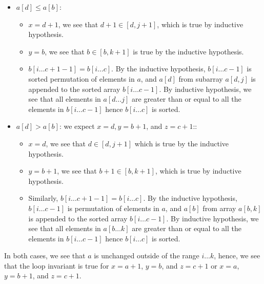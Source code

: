 \begin{parts}
\begin{customsolutionbox}
            \begin{itemize}
                \item \textbf{$a[d] \leq a[b]$}:
                    \begin{itemize}
                        \item $x = d+1$, we see that $d+1 \in [d, j+1]$, which is true by inductive hypothesis.
                        \item $y=b$, we see that $b \in [b, k+1]$ is true by the inductive hypothesis.
                        \item $b[i \ldots c+1-1] = b[i\ldots c]$. By the inductive hypothesis, $b[i \ldots c-1]$ is sorted permutation of elements in $a$, and
                            $a[d]$ from subarray $a[d, j]$ is appended to the sorted array $b[i \ldots c-1]$. By inductive hypothesis, we 
                            see that all elements in $a[d \ldots j]$ are greater than or equal to all the elements in $b[i \ldots c-1]$ hence 
                            $b[i \ldots c]$ is sorted.
                    \end{itemize}
                \item {$a[d] > a[b]$}: we expect $x=d, y=b+1$, and $z=c+1$::
                \begin{itemize}
                    \item $x =d$,  we see that $d \in [d, j+1]$ which is true by the inductive hypothesis.
                    \item $y=b+1$, we see that $b+1 \in [b, k+1]$, which is true by inductive hypothesis.
                    \item Similarly, $b[i \ldots c+1-1] = b[i\ldots c]$. By the inductive hypothesis, $b[i \ldots c-1]$ is permutation of elements in $a$, and
                            $a[b]$ from array $a[b, k]$ is appended to the sorted array $b[i \ldots c-1]$. By inductive hypothesis, we 
                            see that all elements in $a[b \ldots k]$ are greater than or equal to all the elements in $b[i \ldots c-1]$ hence 
                            $b[i \ldots c]$ is sorted.
                \end{itemize}
            \end{itemize}
            In both cases, we see that $a$ is unchanged outside of the range $i \ldots k$, hence, we see that the loop invariant is 
            true for $x = a+1$, $y=b$, and $z=c+1$ or $x=a$, $y=b+1$, and $z=c+1$.
       \end{customsolutionbox}


\end{parts}
